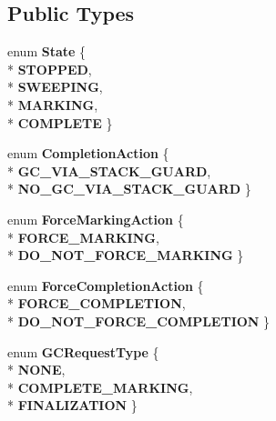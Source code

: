 \subsection*{Public Types}
\begin{DoxyCompactItemize}
\item 
enum {\bfseries State} \{ \\*
{\bfseries S\+T\+O\+P\+P\+ED}, 
\\*
{\bfseries S\+W\+E\+E\+P\+I\+NG}, 
\\*
{\bfseries M\+A\+R\+K\+I\+NG}, 
\\*
{\bfseries C\+O\+M\+P\+L\+E\+TE}
 \}\hypertarget{classv8_1_1internal_1_1_incremental_marking_a0cf5484619bc97cfba5060b3c29102c4}{}\label{classv8_1_1internal_1_1_incremental_marking_a0cf5484619bc97cfba5060b3c29102c4}

\item 
enum {\bfseries Completion\+Action} \{ \\*
{\bfseries G\+C\+\_\+\+V\+I\+A\+\_\+\+S\+T\+A\+C\+K\+\_\+\+G\+U\+A\+RD}, 
\\*
{\bfseries N\+O\+\_\+\+G\+C\+\_\+\+V\+I\+A\+\_\+\+S\+T\+A\+C\+K\+\_\+\+G\+U\+A\+RD}
 \}\hypertarget{classv8_1_1internal_1_1_incremental_marking_a9b543810ec8c13b61aa9dfebb33743a5}{}\label{classv8_1_1internal_1_1_incremental_marking_a9b543810ec8c13b61aa9dfebb33743a5}

\item 
enum {\bfseries Force\+Marking\+Action} \{ \\*
{\bfseries F\+O\+R\+C\+E\+\_\+\+M\+A\+R\+K\+I\+NG}, 
\\*
{\bfseries D\+O\+\_\+\+N\+O\+T\+\_\+\+F\+O\+R\+C\+E\+\_\+\+M\+A\+R\+K\+I\+NG}
 \}\hypertarget{classv8_1_1internal_1_1_incremental_marking_a3b63b2770be1d09ea547fc533ff5efe7}{}\label{classv8_1_1internal_1_1_incremental_marking_a3b63b2770be1d09ea547fc533ff5efe7}

\item 
enum {\bfseries Force\+Completion\+Action} \{ \\*
{\bfseries F\+O\+R\+C\+E\+\_\+\+C\+O\+M\+P\+L\+E\+T\+I\+ON}, 
\\*
{\bfseries D\+O\+\_\+\+N\+O\+T\+\_\+\+F\+O\+R\+C\+E\+\_\+\+C\+O\+M\+P\+L\+E\+T\+I\+ON}
 \}\hypertarget{classv8_1_1internal_1_1_incremental_marking_aee6b9724805db0c072debe78a5c1d729}{}\label{classv8_1_1internal_1_1_incremental_marking_aee6b9724805db0c072debe78a5c1d729}

\item 
enum {\bfseries G\+C\+Request\+Type} \{ \\*
{\bfseries N\+O\+NE}, 
\\*
{\bfseries C\+O\+M\+P\+L\+E\+T\+E\+\_\+\+M\+A\+R\+K\+I\+NG}, 
\\*
{\bfseries F\+I\+N\+A\+L\+I\+Z\+A\+T\+I\+ON}
 \}\hypertarget{classv8_1_1internal_1_1_incremental_marking_a819a2e85f38bbdd8e1265c4b16dbf448}{}\label{classv8_1_1internal_1_1_incremental_marking_a819a2e85f38bbdd8e1265c4b16dbf448}

\end{DoxyCompactItemize}
